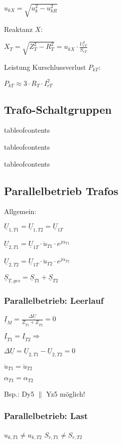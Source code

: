 	$u_{kX} = \sqrt{u^2_k - u^2_{kR}}$

	Reaktanz $X$:

	$X_T = \sqrt{Z^2_T - R^2_T} = u_{kX} \cdot \frac{U^2_{rT}}{S_{rT}}$

	Leistung Kurschlussverlust $P_{kT}$:

	$P_{kT} \approx 3\cdot R_T \cdot I^2_{rT}$

	\subsection{Trafo-Schaltgruppen}
	tableofcontents


	tableofcontents


	tableofcontents

	\subsection{Parallelbetrieb Trafos}
	Allgemein:

	$\underline{U}_{1,T1} = \underline{U}_{1,T2} = \underline{U}_{1T}$

	$\underline{U}_{2,T1} = \underline{U}_{1T} \cdot \ddot{u}_{T1} \cdot e^{j\alpha_{T1}}$

	$\underline{U}_{2,T2} = \underline{U}_{1T} \cdot \ddot{u}_{T2} \cdot e^{j\alpha_{T2}}$

	$\underline{S}_{T,ges} = \underline{S}_{T1} + \underline{S}_{T2}$

	\subsubsection{Parallelbetrieb: Leerlauf}

	$\underline{I}_M = \frac{\Delta \underline{U}}{\underline{Z}_{T1} + \underline{Z}_{T2}} = 0$

	$\underline{I}_{T1} = \underline{I}_{T2} \Rightarrow$

	$ \Delta \underline{U} = \underline{U}_{2,T1} - \underline{U}_{2,T2} = 0 $

	$\ddot{u}_{T1} = \ddot{u}_{T2}$

	$\alpha_{T1} = \alpha_{T2}$

	Bsp.: Dy5 $\parallel$ Yz5 möglich!

	\subsubsection{Parallelbetrieb: Last}

	$u_{k,T1} \neq u_{k,T2}$ \quad $S_{r,T1} \neq S_{r,T2}$

